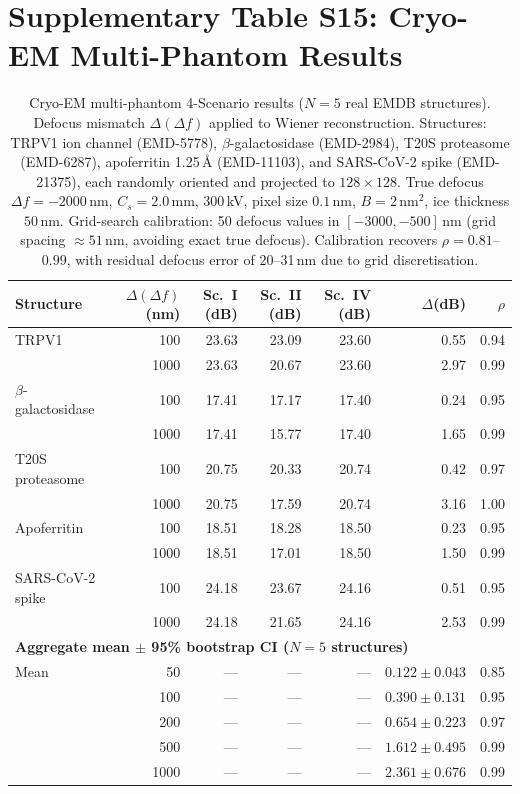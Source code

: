 \documentclass[11pt]{article}
\begin{document}
\section{Supplementary Table S15: Cryo-EM Multi-Phantom Results}
\label{sec:cryoem_scenes}

\begin{table}[htbp]
\centering
\caption{Cryo-EM multi-phantom 4-Scenario results ($N{=}5$ real EMDB structures). Defocus mismatch $\Delta(\Delta f)$ applied to Wiener reconstruction.
Structures: TRPV1 ion channel (EMD-5778), $\beta$-galactosidase (EMD-2984), T20S proteasome (EMD-6287), apoferritin 1.25\,\AA{} (EMD-11103), and SARS-CoV-2 spike (EMD-21375), each randomly oriented and projected to $128 \times 128$.
True defocus $\Delta f{=}{-}2000$\,nm, $C_s{=}2.0$\,mm, 300\,kV, pixel size $0.1$\,nm, $B{=}2$\,nm$^2$, ice thickness $50$\,nm.
Grid-search calibration: 50 defocus values in $[-3000, -500]$\,nm (grid spacing ${\approx}51$\,nm, avoiding exact true defocus).
Calibration recovers $\rho{=}0.81$--$0.99$, with residual defocus error of 20--31\,nm due to grid discretisation.}
\label{tab:cryoem_scenes}
\small
\begin{tabular}{l r r r r r r}
\toprule
Structure & $\Delta(\Delta f)$ (nm) & Sc.~I (dB) & Sc.~II (dB) & Sc.~IV (dB) & $\Delta$(dB) & $\rho$ \\
\midrule
TRPV1              & 100  & 23.63 & 23.09 & 23.60 & 0.55 & 0.94 \\
                   & 1000 & 23.63 & 20.67 & 23.60 & 2.97 & 0.99 \\
$\beta$-galactosidase & 100  & 17.41 & 17.17 & 17.40 & 0.24 & 0.95 \\
                      & 1000 & 17.41 & 15.77 & 17.40 & 1.65 & 0.99 \\
T20S proteasome    & 100  & 20.75 & 20.33 & 20.74 & 0.42 & 0.97 \\
                   & 1000 & 20.75 & 17.59 & 20.74 & 3.16 & 1.00 \\
Apoferritin        & 100  & 18.51 & 18.28 & 18.50 & 0.23 & 0.95 \\
                   & 1000 & 18.51 & 17.01 & 18.50 & 1.50 & 0.99 \\
SARS-CoV-2 spike   & 100  & 24.18 & 23.67 & 24.16 & 0.51 & 0.95 \\
                   & 1000 & 24.18 & 21.65 & 24.16 & 2.53 & 0.99 \\
\midrule
\multicolumn{7}{l}{\textbf{Aggregate mean $\pm$ 95\% bootstrap CI ($N{=}5$ structures)}} \\
\midrule
Mean    &   50 & --- & --- & --- & $0.122 \pm 0.043$ & 0.85 \\
        &  100 & --- & --- & --- & $0.390 \pm 0.131$ & 0.95 \\
        &  200 & --- & --- & --- & $0.654 \pm 0.223$ & 0.97 \\
        &  500 & --- & --- & --- & $1.612 \pm 0.495$ & 0.99 \\
        & 1000 & --- & --- & --- & $2.361 \pm 0.676$ & 0.99 \\
\bottomrule
\end{tabular}
\end{table}
\end{document}
